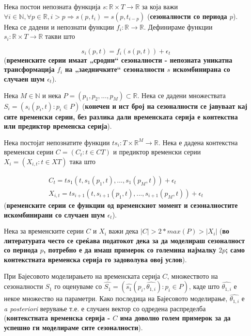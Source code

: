 \documentclass[12pt]{article}
\numberwithin{equation}{section}
\begin{document}
Нека постои непозната функција \(s: \mathbb{R} \times T \to \mathbb{R}\) за која важи \(\forall i \in \mathbb{N}, \forall p \in \mathbb{R}, i > p \Rightarrow s(p, t_i) = s(p, t_{i-p})\) (\textbf{сезоналности со периода \(p\)}). Нека се дадени и непознати функции \(f_i: \mathbb{R} \to \mathbb{R}\). Дефинираме функции \(s_i: \mathbb{R} \times T \to \mathbb{R}\) такви што

\begin{equation}\label{seasonalities_def}
  s_i(p, t) = f_i(s(p, t)) + \epsilon_t
\end{equation}
(\textbf{временските серии имаат „сродни“ сезоналности - непозната уникатна трансформација \(f_i\) на „заедничките“ сезоналности \(s\) искомбинирана со случаен шум \(\epsilon_t\)}).

Нека \(M \in \mathbb{N}\) и нека \(P = (p_1, p_2, ..., p_M) \subset \mathbb{R}\). Нека се дадени множествата \(S_i = (s_i(p_i, t): p_i \in P)\) (\textbf{конечен и ист број на сезоналности се јавуваат кај сите временски серии, без разлика дали временската серија е контекстна или предиктор временска серија}).

Нека постојат непознатите функции \(ts_i: T \times \mathbb{R}^M \to \mathbb{R}\). Нека е дадена контекстна временски серии \(C = (C_t: t \in CT)\) и предиктор временски серии \(X_i = (X_{i,t}: t \in XT)\) така што

\begin{equation}\label{timeseries_def}
  \begin{gathered}
C_t = ts_1(t, s_1(p_1, t), ..., s_1(p_M, t)) + \epsilon_t\\
X_{i,t} = ts_{i+1}(t, s_{i+1}(p_1, t), ..., s_{i+1}(p_M, t)) + \epsilon_t
  \end{gathered}
\end{equation}
(\textbf{временските серии се функции од временскиот момент и сезоналностите искомбинирани со случаен шум \(\epsilon_t\)}).

Нека за временските серии \(C\) и \(X_i\) важи дека \(\lvert C \rvert > 2 * max(P) > \lvert X_i \rvert\) (\textbf{во литературата често се среќава податокот дека за да моделираш сезоналност со периода \(p\), потребно е да имаш примерок со големина најмалку \(2p\); само контекстната временска серија го задоволува овој услов}).

При Бајесовото моделирањето на временската серија \(C\), множеството на сезоналности \(S_1\) го оценуваме со \(\widehat{S_1} = (\widehat{s_1}(p_i, \widehat{\theta_{1, i}}): p_i \in P)\), каде што \(\widehat{\theta_{1, i}}\) е некое множество на параметри. Како последица на Бајесовото моделирање, \(\widehat{\theta_{1, i}}\) е \textit{a posteriori} верување т.е. е случаен вектор со одредена распределба (\textbf{контекстната временска серија - \(C\) има доволно голем примерок за да успешно ги моделираме сите сезоналности}).
\end{document}
